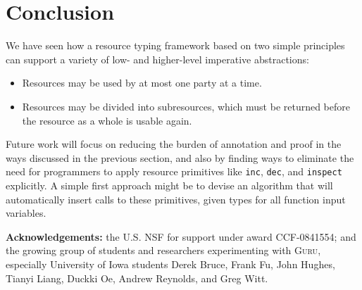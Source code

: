 \documentclass[9pt,natbib]{sigplanconf}
\begin{document}
\section{Conclusion}

We have seen how a resource typing framework based on two simple
principles can support a variety of low- and higher-level imperative
abstractions:

\begin{itemize}
\item Resources may be used by at most one party at a time.
\item Resources may be divided into subresources, which must be
  returned before the resource as a whole is usable again.
\end{itemize}

\noindent Future work will focus on reducing the burden of annotation
and proof in the ways discussed in the previous section, and also by
finding ways to eliminate the need for programmers to apply resource
primitives like \texttt{inc}, \texttt{dec}, and \texttt{inspect}
explicitly.  A simple first approach might be to devise an algorithm
that will automatically insert calls to these primitives, given types
for all function input variables.  

\textbf{Acknowledgements:} the U.S. NSF for support under award
CCF-0841554; and the growing group of students and researchers
experimenting with \textsc{Guru}, especially University of Iowa
students Derek Bruce, Frank Fu, John Hughes, Tianyi Liang, Duckki Oe,
Andrew Reynolds, and Greg Witt.




\end{document}

